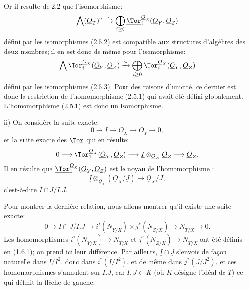 
Or il
résulte de 2.2 que l'isomorphisme:
\[
\bigwedge(\underline{O}_T)^n\xrightarrow{\sim}
\bigoplus_{i\ge0}\underline{\Tor}_i^{\underline{O}_X}(\underline{O}_Y,\underline{O}_Z)
\]
défini par les isomorphismes (2.5.2) est compatible aux structures d'algèbres des deux membres; il en est donc de même pour l'isomorphisme:
\[
\bigwedge\underline{\Tor}_i^{\underline{O}_X}(\underline{O}_Y,\underline{O}_Z)\xrightarrow{\sim}
\bigoplus_{i\ge0}\underline{\Tor}_i^{\underline{O}_X}(\underline{O}_Y,\underline{O}_Z)
\]
défini par les isomorphismes (2.5.3). Pour des raisons d'unicité, ce dernier est donc la restriction de l'homomorphisme (2.5.1) qui avait été défini globalement. L'homomorphisme (2.5.1) est donc un isomorphisme.

ii) On considère la suite exacte:
\[
0\longrightarrow \underline{I}\longrightarrow \underline{O}_X\longrightarrow \underline{O}_Y\longrightarrow0,
\]
et la suite exacte des \(\underline{\Tor}\) qui en résulte:
\[
0\longrightarrow\underline{\Tor}_1^{\underline{O}_X}(\underline{O}_Y,\underline{O}_Z)
\longrightarrow \underline{I}\otimes_{\underline{O}_X}\underline{O}_Z
\longrightarrow \underline{O}_Z.
\]
Il en résulte que \(\underline{\Tor}_1^{\underline{O}_X}(\underline{O}_Y,\underline{O}_Z)\) est le noyau de l'homomorphisme :
\[
\underline{I}\otimes_{\underline{O}_X}(\underline{O}_X/\underline{J})\longrightarrow \underline{O}_X/J,
\]
c'est-à-dire \(\underline{I}\cap \underline{J}/\underline{I}.\underline{J}\).

Pour montrer la dernière relation, nous allons montrer qu'il existe une suite exacte:
\[
\underline{0}\longrightarrow \underline{I}\cap \underline{J}/\underline{I}.\underline{J}
\longrightarrow i^*(\underline{N}_{Y/X})\times j^*(\underline{N}_{Z/X})
\longrightarrow \underline{N}_{T/X}\longrightarrow0.
\]
Les homomorphismes \(i^*(\underline{N}_{Y/X})\to \underline{N}_{T/X}\) et \(j^*(\underline{N}_{Z/X})\to \underline{N}_{T/X}\) ont été définis en (1.6.1); on prend ici leur différence. Par ailleurs, \(\underline{I}\cap \underline{J}\) s'envoie de façon naturelle dans \(\underline{I}/\underline{I}^2\), donc dans \(i^*(\underline{I}/\underline{I}^2)\), et de même dans \(j^*(\underline{J}/\underline{J}^2)\), et ces homomorphismes s'annulent sur \(\underline{I}.\underline{J}\), car \(\underline{I},\underline{J}\subset \underline{K}\) (où \(\underline{K}\) désigne l'idéal de \(T\)) ce qui définit la flèche de gauche.

